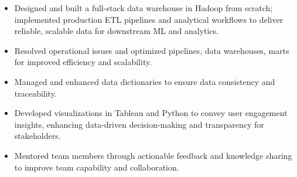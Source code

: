 \documentclass[10pt]{resume}
\begin{document}
\vspace{-0.9em}
\begin{itemize}

\item Designed and built a full-stack data warehouse in Hadoop from scratch; implemented production ETL pipelines and analytical workflows to deliver reliable, scalable data for downstream ML and analytics.

\item Resolved operational issues and optimized pipelines, data warehouses, marts for improved efficiency and scalability.

\item Managed and enhanced data dictionaries to ensure data consistency and traceability. 

\item Developed visualizations in Tableau and Python to convey user engagement insights, enhancing data-driven decision-making and transparency for stakeholders.
\item Mentored team members through actionable feedback and knowledge sharing to improve team capability and collaboration.
\end{itemize}
\end{document}
